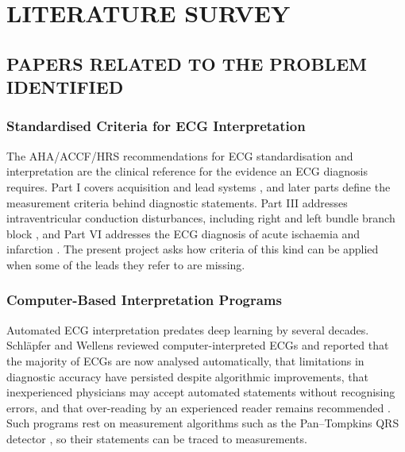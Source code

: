 \chapter{LITERATURE SURVEY}

\section{PAPERS RELATED TO THE PROBLEM IDENTIFIED}

\subsection*{Standardised Criteria for ECG Interpretation}
The AHA/ACCF/HRS recommendations for ECG standardisation and interpretation are the clinical reference for the evidence an ECG diagnosis requires. Part I covers acquisition and lead systems \cite{KLIGFIELD2007AHA}, and later parts define the measurement criteria behind diagnostic statements. Part III addresses intraventricular conduction disturbances, including right and left bundle branch block \cite{SURAWICZ2009AHA}, and Part VI addresses the ECG diagnosis of acute ischaemia and infarction \cite{WAGNER2009AHA}. The present project asks how criteria of this kind can be applied when some of the leads they refer to are missing.

\subsection*{Computer-Based Interpretation Programs}
Automated ECG interpretation predates deep learning by several decades. Schläpfer and Wellens reviewed computer-interpreted ECGs and reported that the majority of ECGs are now analysed automatically, that limitations in diagnostic accuracy have persisted despite algorithmic improvements, that inexperienced physicians may accept automated statements without recognising errors, and that over-reading by an experienced reader remains recommended \cite{SCHLAPFER2017COMPUTER}. Such programs rest on measurement algorithms such as the Pan--Tompkins QRS detector \cite{PAN1985QRS}, so their statements can be traced to measurements.

